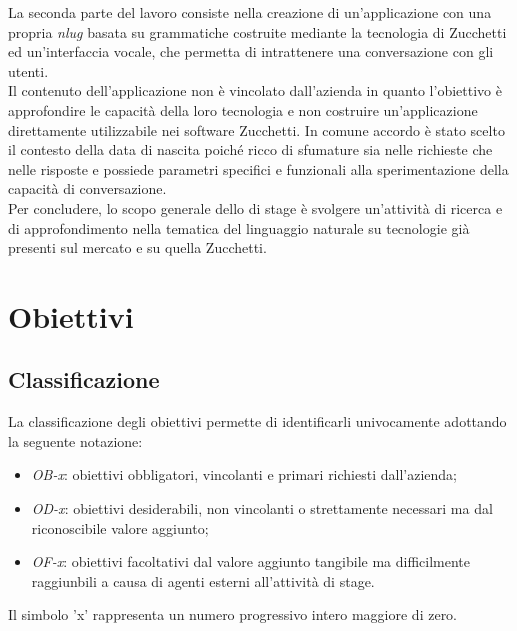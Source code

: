 La seconda parte del lavoro consiste nella creazione di un'applicazione con una propria \emph{\gls{nlug}} basata su grammatiche costruite mediante la tecnologia di Zucchetti ed un'interfaccia vocale, che permetta di intrattenere una conversazione con gli utenti. \\
Il contenuto dell'applicazione non è vincolato dall'azienda in quanto l'obiettivo è approfondire le capacità della loro tecnologia e non costruire un'applicazione direttamente utilizzabile nei software Zucchetti. In comune accordo è stato scelto il contesto della data di nascita poiché ricco di sfumature sia nelle richieste che nelle risposte e possiede parametri specifici e funzionali alla sperimentazione della capacità di conversazione. \\
Per concludere, lo scopo generale dello di stage è svolgere un'attività di ricerca e di approfondimento nella tematica del linguaggio naturale su tecnologie già presenti sul mercato e su quella Zucchetti.

\section{Obiettivi}
\label{section:obiettivi}
	\subsection{Classificazione}
	La classificazione degli obiettivi permette di identificarli univocamente adottando la seguente notazione:
	\begin{itemize}
		\item \textit{OB-x}: obiettivi obbligatori, vincolanti e primari richiesti dall'azienda;
		\item \textit{OD-x}: obiettivi desiderabili, non vincolanti o strettamente necessari ma dal riconoscibile valore aggiunto;
		\item \textit{OF-x}: obiettivi facoltativi dal valore aggiunto tangibile ma difficilmente raggiunbili a causa di agenti esterni all'attività di stage.
	\end{itemize}
	Il simbolo 'x' rappresenta un numero progressivo intero maggiore di zero.
	
